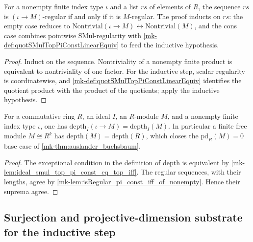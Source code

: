 \begin{lemma}\label{mk-lem:isRegular_pi_const_iff_of_nonempty}
  \leanok

  For a nonempty finite index type \(\iota\) and a list \(rs\) of elements of \(R\), the
  sequence \(rs\) is \((\iota \to M)\)-regular if and only if it is \(M\)-regular. The
  proof inducts on \(rs\): the empty case reduces to
  \(\text{Nontrivial}(\iota \to M) \leftrightarrow \text{Nontrivial}(M)\), and the cons
  case combines pointwise \(\text{SMul}\)-regularity with
  \ref{mk-def:quotSMulTopPiConstLinearEquiv} to feed the inductive hypothesis.
\end{lemma}
\begin{proof}
  \leanok

Induct on the sequence. Nontriviality of a nonempty finite product
  is equivalent to nontriviality of one factor. For the inductive step,
  scalar regularity is coordinatewise, and
  \ref{mk-def:quotSMulTopPiConstLinearEquiv} identifies the quotient product
  with the product of the quotients; apply the inductive hypothesis.
\end{proof}

\begin{lemma}\label{mk-lem:depth_pi_const_eq_depth_of_nonempty}
  \leanok

  For a commutative ring \(R\), an ideal \(I\), an \(R\)-module \(M\), and a nonempty
  finite index type \(\iota\), one has \(\text{depth}_I(\iota \to M) = \text{depth}_I(M)\).
  In particular a finite free module \(M \cong R^k\) has \(\text{depth}(M) = \text{depth}(R)\),
  which closes the \(\text{pd}_R(M) = 0\) base case of \ref{mk-thm:auslander_buchsbaum}.
\end{lemma}
\begin{proof}
  \leanok

The exceptional condition in the definition of depth is equivalent
  by \ref{mk-lem:ideal_smul_top_pi_const_eq_top_iff}. The regular sequences,
  with their lengths, agree by
  \ref{mk-lem:isRegular_pi_const_iff_of_nonempty}. Hence their suprema agree.
\end{proof}

\subsection{Surjection and projective-dimension substrate for the inductive step}
\label{mk-subsec:ab_surjection_substrate}


